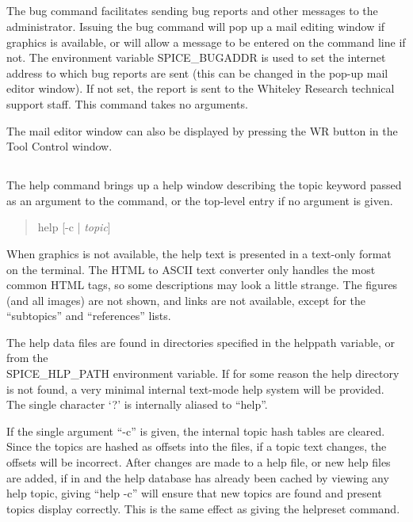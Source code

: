 \subsection{}


The {\cb bug} command facilitates sending bug reports and other
messages to the {\WRspice} administrator.  Issuing the {\cb bug}
command will pop up a mail editing window if graphics is available,
or will allow a message to be entered on the command line if not. 
The environment variable {\et SPICE\_BUGADDR} is used to set the
internet address to which bug reports are sent (this can be changed
in the pop-up mail editor window).  If not set, the report is sent
to the Whiteley Research technical support staff.  This command
takes no arguments.

The mail editor window can also be displayed by pressing the {\cb WR}
button in the {\cb Tool Control} window.

\subsection{}
\label{help}


The {\cb help} command brings up a help window describing the topic
keyword passed as an argument to the command, or the top-level entry
if no argument is given.
\begin{quote}\vt
help [-c | {\it topic\/}]
\end{quote}
When graphics is not available, the help text is presented in a
text-only format on the terminal.  The HTML to ASCII text converter
only handles the most common HTML tags, so some descriptions may look
a little strange.  The figures (and all images) are not shown, and
links are not available, except for the ``subtopics'' and
``references'' lists.

The help data files are found in directories specified in the {\et
helppath} variable, or from the\\ {\et SPICE\_HLP\_PATH} environment
variable.  If for some reason the help directory is not found, a very
minimal internal text-mode help system will be provided.  The single
character `{\vt ?}' is internally aliased to ``{\vt help}''.

If the single argument ``{\vt -c}'' is given, the internal topic hash
tables are cleared.  Since the topics are hashed as offsets into the
files, if a topic text changes, the offsets will be incorrect.  After
changes are made to a help file, or new help files are added, if in
{\WRspice} and the help database has already been cached by viewing
any help topic, giving ``{\vt help -c}'' will ensure that new topics
are found and present topics display correctly.  This is the same
effect as giving the {\cb helpreset} command.

